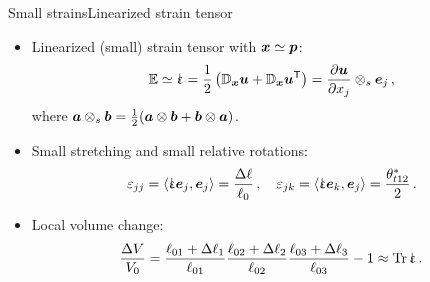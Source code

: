\begin{frame}{Small strains}{Linearized strain tensor}

\begin{itemize}
\item Linearized (small) strain tensor with ${\boldsymbol{x}}\simeq{\boldsymbol{p}}$:
\begin{displaymath}
\GreenL\simeq\strain=\demi\left(\Gradx\uv+\Gradx\uv^\itr\right)=\frac{\partial\uv}{\partial\xj_j}\otimes_s\ev_j\,,
\end{displaymath}
where ${\boldsymbol{a}}\otimes_s{\boldsymbol{b}}=\frac{1}{2}({\boldsymbol{a}}\otimes{\boldsymbol{b}}+{\boldsymbol{b}}\otimes{\boldsymbol{a}})$.
\item Small stretching and small relative rotations:
\begin{displaymath}
\strainj_{jj}=\scal{\strain\ev_j,\ev_j}=\frac{\Delta\ell}{\ell_0}\,,\quad\strainj_{jk}=\scal{\strain\ev_k,\ev_j}=\frac{\theta_{t12}^*}{2}\,.
\end{displaymath}
\item Local volume change:
\begin{displaymath}
\frac{\Delta V}{V_0}=\frac{\ell_{01}+\Delta\ell_1}{\ell_{01}}\frac{\ell_{02}+\Delta\ell_2}{\ell_{02}}\frac{\ell_{03}+\Delta\ell_3}{\ell_{03}}-1\approx\trace\strain\,.
\end{displaymath}
\end{itemize}

\end{frame}


